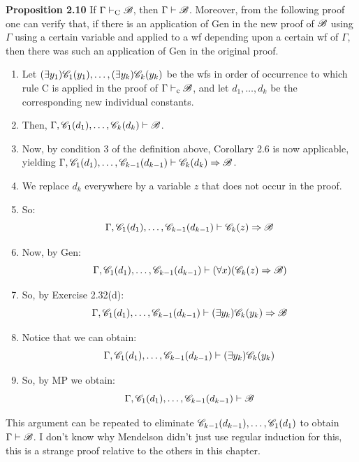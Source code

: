 \textbf{Proposition 2.10}
If $\Gamma \vdash_\text{C} \mathscr{B}$, then $\Gamma \vdash \mathscr{B}$. Moreover, from the following proof one can verify that, if there is an application of Gen in the new  proof of  $\mathscr{B}$ using $\Gamma$ using a certain variable and applied to a wf depending upon a certain wf of $\Gamma$, then there was such an application of Gen in the original proof.

\begin{enumerate}
    \item Let $(\exists y_1)\mathscr{C}_1(y_1), \dots, (\exists y_k)\mathscr{C}_k(y_k)$ be the wfs in order of occurrence to which rule C is applied in the proof of $\Gamma \vdash_\text{c} \mathscr{B}$, and let $d_1, \dots, d_k$ be the corresponding new individual constants. 
    \item Then, $\Gamma, \mathscr{C}_1(d_1), \dots, \mathscr{C}_k(d_k) \vdash \mathscr{B}$. 
    \item Now, by condition 3 of the definition above, Corollary 2.6 is now applicable, yielding $\Gamma, \mathscr{C}_1(d_1), \dots, \mathscr{C}_{k-1}(d_{k-1}) \vdash \mathscr{C}_k(d_k) \Rightarrow \mathscr{B}$.
    \item We replace $d_k$ everywhere by a variable $z$ that does not occur in the proof.
    \item So:
    \[\Gamma, \mathscr{C}_1(d_1), \dots, \mathscr{C}_{k-1}(d_{k-1}) \vdash \mathscr{C}_k(z) \Rightarrow \mathscr{B}\]
    \item Now, by Gen:
    \[\Gamma, \mathscr{C}_1(d_1), \dots, \mathscr{C}_{k-1}(d_{k-1}) \vdash (\forall x)(\mathscr{C}_k(z) \Rightarrow \mathscr{B})\]
    \item So, by Exercise 2.32(d):
    \[\Gamma, \mathscr{C}_1(d_1), \dots, \mathscr{C}_{k-1}(d_{k-1}) \vdash (\exists y_k)\mathscr{C}_k(y_k) \Rightarrow \mathscr{B}\]
    \item Notice that we can obtain:
    \[\Gamma, \mathscr{C}_1(d_1), \dots, \mathscr{C}_{k-1}(d_{k-1}) \vdash (\exists y_k)\mathscr{C}_k(y_k)\]
    \item So, by MP we obtain:
    \[\Gamma, \mathscr{C}_1(d_1), \dots, \mathscr{C}_{k-1}(d_{k-1}) \vdash \mathscr{B}\]
\end{enumerate}
This argument can be repeated to eliminate $\mathscr{C}_{k-1}(d_{k-1}), \dots, \mathscr{C}_1(d_1)$ to obtain $\Gamma \vdash \mathscr{B}$. I don't know why Mendelson didn't just use regular induction for this, this is a strange proof relative to the others in this chapter.
